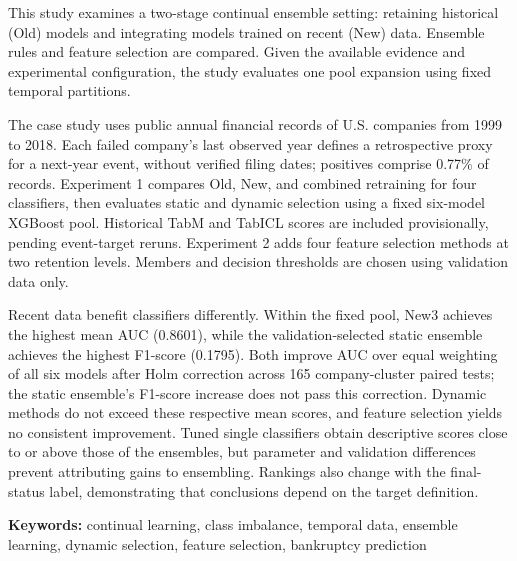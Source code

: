 This study examines a two-stage continual ensemble setting: retaining historical (Old) models and integrating models trained on recent (New) data. Ensemble rules and feature selection are compared. Given the available evidence and experimental configuration, the study evaluates one pool expansion using fixed temporal partitions.

The case study uses public annual financial records of U.S. companies from 1999 to 2018. Each failed company's last observed year defines a retrospective proxy for a next-year event, without verified filing dates; positives comprise 0.77\% of records. Experiment 1 compares Old, New, and combined retraining for four classifiers, then evaluates static and dynamic selection using a fixed six-model XGBoost pool. Historical TabM and TabICL scores are included provisionally, pending event-target reruns. Experiment 2 adds four feature selection methods at two retention levels. Members and decision thresholds are chosen using validation data only.

Recent data benefit classifiers differently. Within the fixed pool, New3 achieves the highest mean AUC (0.8601), while the validation-selected static ensemble achieves the highest F1-score (0.1795). Both improve AUC over equal weighting of all six models after Holm correction across 165 company-cluster paired tests; the static ensemble's F1-score increase does not pass this correction. Dynamic methods do not exceed these respective mean scores, and feature selection yields no consistent improvement. Tuned single classifiers obtain descriptive scores close to or above those of the ensembles, but parameter and validation differences prevent attributing gains to ensembling. Rankings also change with the final-status label, demonstrating that conclusions depend on the target definition.

\noindent\textbf{Keywords:} continual learning, class imbalance, temporal data, ensemble learning, dynamic selection, feature selection, bankruptcy prediction
